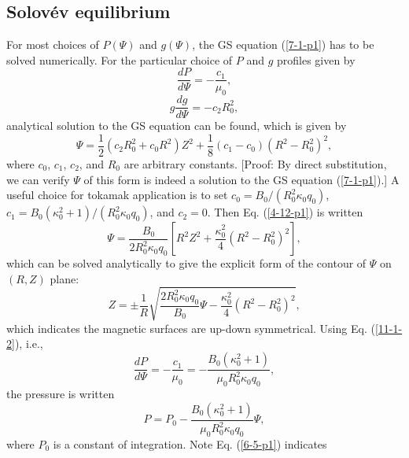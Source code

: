 \documentclass{article}
\begin{document}
\subsection{Solov{\'e}v equilibrium}\label{20-4-8-p1}

For most choices of $P (\Psi)$ and $g (\Psi)$, the GS equation (\ref{7-1-p1})
has to be solved numerically. For the particular choice of $P$ and $g$
profiles given by
\begin{equation}
  \label{11-1-2} \frac{d P}{d \Psi} = - \frac{c_1}{\mu_0},
\end{equation}
\begin{equation}
  \label{3-15-a1} g \frac{d g}{d \Psi} = - c_2 R_0^2,
\end{equation}
analytical solution to the GS equation can be found, which is given
by{\cite{jardin2010}}
\begin{equation}
  \label{4-12-p1} \Psi = \frac{1}{2} (c_2 R_0^2 + c_0 R^2) Z^2 + \frac{1}{8}
  (c_1 - c_0) (R^2 - R_0^2)^2,
\end{equation}
where $c_0$, $c_1$, $c_2$, and $R_0$ are arbitrary constants. [Proof: By
direct substitution, we can verify $\Psi$ of this form is indeed a solution to
the GS equation (\ref{7-1-p1}).] A useful choice for tokamak application is to
set $c_0 = B_0 / (R_0^2 \kappa_0 q_0)$, $c_1 = B_0 (\kappa_0^2 + 1) / (R_0^2
\kappa_0 q_0)$, and $c_2 = 0$. Then Eq. (\ref{4-12-p1}) is written
\begin{equation}
  \label{6-5-p1} \Psi = \frac{B_0}{2 R_0^2 \kappa_0 q_0} \left[ R^2 Z^2 +
  \frac{\kappa_0^2}{4} (R^2 - R_0^2)^2 \right],
\end{equation}
which can be solved analytically to give the explicit form of the contour of
$\Psi$ on $(R, Z)$ plane:
\begin{equation}
  \label{9-9-1} Z = \pm \frac{1}{R} \sqrt{\frac{2 R_0^2 \kappa_0 q_0}{B_0}
  \Psi - \frac{\kappa_0^2}{4} (R^2 - R_0^2)^2},
\end{equation}
which indicates the magnetic surfaces are up-down symmetrical. Using Eq.
(\ref{11-1-2}), i.e.,
\begin{equation}
  \frac{d P}{d \Psi} = - \frac{c_1}{\mu_0} = - \frac{B_0 (\kappa_0^2 +
  1)}{\mu_0 R_0^2 \kappa_0 q_0},
\end{equation}
the pressure is written
\begin{equation}
  \label{6-5-1} P = P_0 - \frac{B_0 (\kappa_0^2 + 1)}{\mu_0 R_0^2 \kappa_0
  q_0} \Psi,
\end{equation}
where $P_0$ is a constant of integration. Note Eq. (\ref{6-5-p1}) indicates
\end{document}
